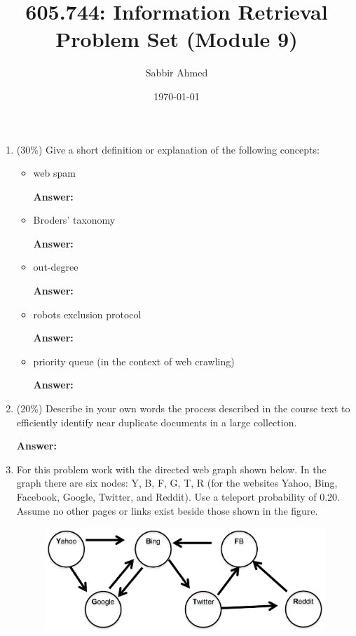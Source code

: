 \documentclass[11pt]{article}
\title{605.744: Information Retrieval \\ Problem Set (Module 9)}
\author{Sabbir Ahmed}
\date{\today}
\begin{document}
\maketitle

    \begin{enumerate}

        \item (30\%) Give a short definition or explanation of the following concepts:
        \begin{itemize}
            \item web spam

            \textbf{Answer:}

            \item Broders' taxonomy

            \textbf{Answer:}

            \item out-degree

            \textbf{Answer:}

            \item robots exclusion protocol

            \textbf{Answer:}

            \item priority queue (in the context of web crawling)

            \textbf{Answer:}

        \end{itemize}

        \item (20\%) Describe in your own words the process described in the course text to efficiently identify near duplicate documents in a large collection.

        \textbf{Answer:}

        \item For this problem work with the directed web graph shown below. In the graph there are six nodes: Y, B, F, G, T, R (for the websites Yahoo, Bing, Facebook, Google, Twitter, and Reddit). Use a teleport probability of 0.20. Assume no other pages or links exist beside those shown in the figure.

        \begin{figure}[!ht]
            \includegraphics[scale=0.5]{graph.png}
            \centering
        \end{figure}


\end{enumerate}
\end{document}
